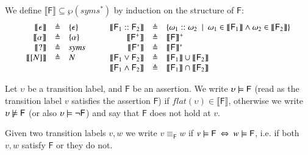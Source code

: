 \begin{definition}
 We define $\llbracket \mathsf{F}\rrbracket \subseteq\wp(\mathit{syms}^*)$ by induction on the structure of $\mathsf{F}$: 
\[
\begin{array}{rcl@{\hspace{1cm}}rcl}
 \llbracket \epsilon \rrbracket &\defeq&  \{\epsilon\}
 & \llbracket \mathsf{F}_1::\mathsf{F}_2 \rrbracket &\defeq& \{\omega_1 :: \omega_2~\mid~ \omega_1 \in \llbracket \mathsf{F}_1 \rrbracket \wedge \omega_2 \in \llbracket \mathsf{F}_2 \rrbracket\}  \\
 \llbracket \alpha \rrbracket &\defeq&  \{\alpha\} 
 & \llbracket \mathsf{F}^+ \rrbracket &\defeq& \llbracket \mathsf{F} \rrbracket^+  \\
 \llbracket ? \rrbracket &\defeq&   \mathit{syms}
 & \llbracket \mathsf{F}^* \rrbracket &\defeq& \llbracket \mathsf{F} \rrbracket^*  \\
 \llbracket [N]\rrbracket &\defeq&   N
 & \llbracket  \mathsf{F}_1 \vee \mathsf{F}_2 \rrbracket &\defeq& \llbracket  \mathsf{F}_1\rrbracket \cup \llbracket  \mathsf{F}_2\rrbracket  \\
 &&&\llbracket  \mathsf{F}_1 \wedge \mathsf{F}_2 \rrbracket &\defeq& \llbracket \mathsf{F}_1 \rrbracket \cap \llbracket \mathsf{F}_2\rrbracket 
\end{array}
\]
\end{definition}




\begin{definition}\label{sec:semantics}
Let  $\upsilon$ be  a transition label, and $\mathsf{F}$ be an assertion.
We write $\upsilon \models \mathsf{F}$ (read as the transition label $v$ satisfies the assertion $\mathsf{F}$) 
if $\mathit{flat}(\upsilon)\in \llbracket \mathsf{F}\rrbracket$, otherwise we write $\upsilon \not\models \mathsf{F}$ (or also $\upsilon \models \neg \mathsf{F}$) and say that $\mathsf{F}$ does not hold at $v$. 
\end{definition}

Given two transition labels $v,w$ we write $v\equiv_{\mathsf{F}} w$ if $v \models \mathsf{F}\ \Leftrightarrow\ w \models \mathsf{F}$, i.e. if both $v,w$ satisfy $\mathsf{F}$ or they do not.

